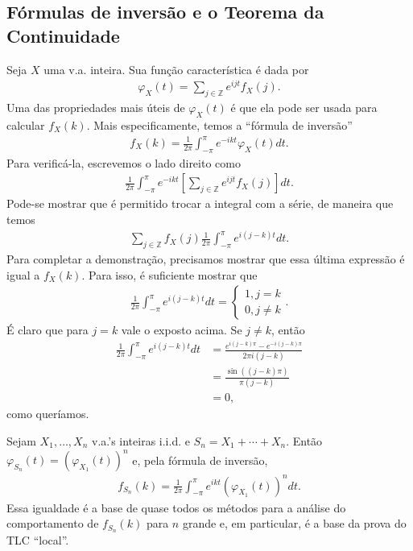 \documentclass[../Notas.tex]{subfiles}
\begin{document}
\subsection{Fórmulas de inversão e o Teorema da Continuidade}
Seja $X$ uma v.a. inteira. Sua função característica é dada por
\begin{align*}
    \varphi_X(t) = \sum_{j\in\mathbb{Z}} e^{ijt}f_X(j).
\end{align*}
Uma das propriedades mais úteis de $\varphi_X(t)$ é que ela pode ser usada para calcular $f_X(k)$. Mais especificamente, temos a ``fórmula de inversão''
\begin{align*}
    f_X(k) = \frac{1}{2\pi}\int_{-\pi}^{\pi} e^{-ikt}\varphi_X(t) dt.
\end{align*}
Para verificá-la, escrevemos o lado direito como
\begin{align*}
    \frac{1}{2\pi}\int_{-\pi}^{\pi} e^{-ikt}\left[ \sum_{j\in\mathbb{Z}} e^{ijt}f_X(j) \right] dt.
\end{align*}
Pode-se mostrar que é permitido trocar a integral com a série, de maneira que temos
\begin{align*}
    \sum_{j\in\mathbb{Z}} f_X(j)\frac{1}{2\pi}\int_{-\pi}^{\pi} e^{i(j-k)t} dt.
\end{align*}
Para completar a demonstração, precisamos mostrar que essa última expressão é igual a $f_X(k)$. Para isso, é suficiente mostrar que
\begin{align*}
    \frac{1}{2\pi}\int_{-\pi}^{\pi} e^{i(j-k)t} dt = \begin{cases}
    1, j = k \\
    0, j\neq k
    \end{cases}.
\end{align*}
É claro que para $j=k$ vale o exposto acima. Se $j\neq k$, então
\begin{align*}
    \frac{1}{2\pi}\int_{-\pi}^{\pi} e^{i(j-k)t} dt &= \frac{e^{i(j-k)\pi} - e^{-i(j-k)\pi}}{2\pi i(j-k)} \\
    &= \frac{ \sin((j-k)\pi) }{\pi(j-k)} \\
    &= 0,
\end{align*}
como queríamos.

\begin{example}
    Sejam $X_1, \dots, X_n$ v.a.'s inteiras i.i.d. e $S_n = X_1 + \cdots + X_n$. Então $\varphi_{S_n}(t) = (\varphi_{X_1}(t))^n$ e, pela fórmula de inversão,
    \begin{align*}
        f_{S_n}(k) = \frac{1}{2\pi}\int_{-\pi}^{\pi} e^{ikt}(\varphi_{X_1}(t))^n dt.
    \end{align*}
    Essa igualdade é a base de quase todos os métodos para a análise do comportamento de $f_{S_n}(k)$ para $n$ grande e, em particular, é a base da prova do TLC ``local''.
\end{example}
\end{document}

